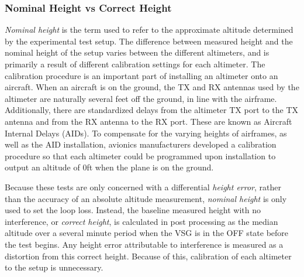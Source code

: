 \subsubsection{Nominal Height vs Correct Height}\label{subsub:nominal}
\textit{Nominal height} is the term used to refer to the approximate altitude determined by the experimental test setup. The difference between measured height and the nominal height of the setup varies between the different altimeters, and is primarily a result of different calibration settings for each altimeter. The calibration procedure is an important part of installing an altimeter onto an aircraft. When an aircraft is on the ground, the TX and RX antennas used by the altimeter are naturally several feet off the ground, in line with the airframe. Additionally, there are standardized delays from the altimeter TX port to the TX antenna and from the RX antenna to the RX port. These are known as Aircraft Internal Delays (AIDs). To compensate for the varying heights of airframes, as well as the AID installation, avionics manufacturers developed a calibration procedure so that each altimeter could be programmed upon installation to output an altitude of 0ft when the plane is on the ground. 

Because these tests are only concerned with a differential \textit{height error}, rather than the accuracy of an absolute altitude measurement, \textit{nominal height} is only used to set the loop loss. Instead, the baseline measured height with no interference, or \textit{correct height}, is calculated in post processing as the median altitude over a several minute period when the VSG is in the OFF state before the test begins. Any height error attributable to interference is measured as a distortion from this correct height. Because of this, calibration of each altimeter to the setup is unnecessary. 

